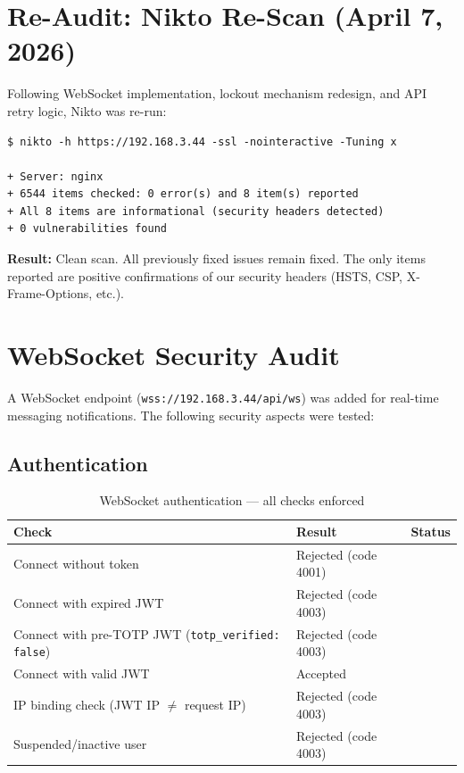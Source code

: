 \documentclass[12pt,a4paper]{article}
\newcommand{\pass}{\textcolor{success}{\checkmark}}
\begin{document}
\section{Re-Audit: Nikto Re-Scan (April 7, 2026)}

Following WebSocket implementation, lockout mechanism redesign, and API retry logic, Nikto was re-run:

\begin{lstlisting}
$ nikto -h https://192.168.3.44 -ssl -nointeractive -Tuning x

+ Server: nginx
+ 6544 items checked: 0 error(s) and 8 item(s) reported
+ All 8 items are informational (security headers detected)
+ 0 vulnerabilities found
\end{lstlisting}

\textbf{Result:} Clean scan. All previously fixed issues remain fixed. The only items reported are positive confirmations of our security headers (HSTS, CSP, X-Frame-Options, etc.).

\section{WebSocket Security Audit}

A WebSocket endpoint (\texttt{wss://192.168.3.44/api/ws}) was added for real-time messaging notifications. The following security aspects were tested:

\subsection{Authentication}

\begin{table}[H]
\centering
\begin{tabularx}{\textwidth}{Xlc}
\toprule
\textbf{Check} & \textbf{Result} & \textbf{Status} \\
\midrule
Connect without token & Rejected (code 4001) & \pass \\
Connect with expired JWT & Rejected (code 4003) & \pass \\
Connect with pre-TOTP JWT (\texttt{totp\_verified: false}) & Rejected (code 4003) & \pass \\
Connect with valid JWT & Accepted & \pass \\
IP binding check (JWT IP $\neq$ request IP) & Rejected (code 4003) & \pass \\
Suspended/inactive user & Rejected (code 4003) & \pass \\
\bottomrule
\end{tabularx}
\caption{WebSocket authentication --- all checks enforced}
\end{table}
\end{document}
